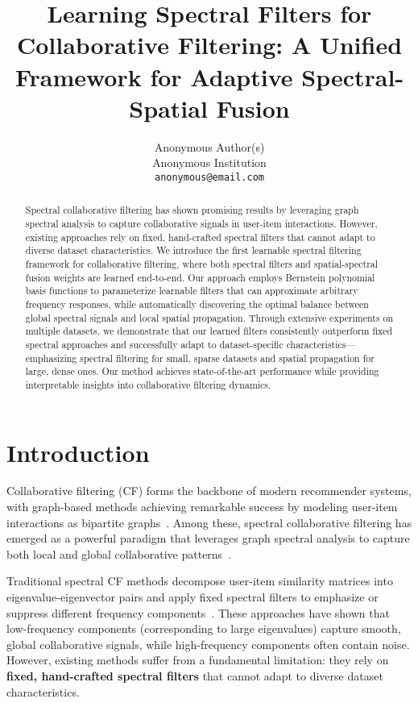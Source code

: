 \documentclass[10pt,twocolumn,letterpaper]{article}
\begin{document}
\title{Learning Spectral Filters for Collaborative Filtering: A Unified Framework for Adaptive Spectral-Spatial Fusion}

\author{Anonymous Author(s)\\
Anonymous Institution\\
{\tt\small anonymous@email.com}
}

\maketitle

\begin{abstract}
Spectral collaborative filtering has shown promising results by leveraging graph spectral analysis to capture collaborative signals in user-item interactions. However, existing approaches rely on fixed, hand-crafted spectral filters that cannot adapt to diverse dataset characteristics. We introduce the first learnable spectral filtering framework for collaborative filtering, where both spectral filters and spatial-spectral fusion weights are learned end-to-end. Our approach employs Bernstein polynomial basis functions to parameterize learnable filters that can approximate arbitrary frequency responses, while automatically discovering the optimal balance between global spectral signals and local spatial propagation. Through extensive experiments on multiple datasets, we demonstrate that our learned filters consistently outperform fixed spectral approaches and successfully adapt to dataset-specific characteristics—emphasizing spectral filtering for small, sparse datasets and spatial propagation for large, dense ones. Our method achieves state-of-the-art performance while providing interpretable insights into collaborative filtering dynamics.
\end{abstract}

\section{Introduction}

Collaborative filtering (CF) forms the backbone of modern recommender systems, with graph-based methods achieving remarkable success by modeling user-item interactions as bipartite graphs~\cite{he2020lightgcn,wang2019neural}. Among these, spectral collaborative filtering has emerged as a powerful paradigm that leverages graph spectral analysis to capture both local and global collaborative patterns~\cite{zheng2020spectral,liu2021gfcf}.

Traditional spectral CF methods decompose user-item similarity matrices into eigenvalue-eigenvector pairs and apply fixed spectral filters to emphasize or suppress different frequency components~\cite{liu2021gfcf}. These approaches have shown that low-frequency components (corresponding to large eigenvalues) capture smooth, global collaborative signals, while high-frequency components often contain noise. However, existing methods suffer from a fundamental limitation: they rely on \textbf{fixed, hand-crafted spectral filters} that cannot adapt to diverse dataset characteristics.
\end{document}
